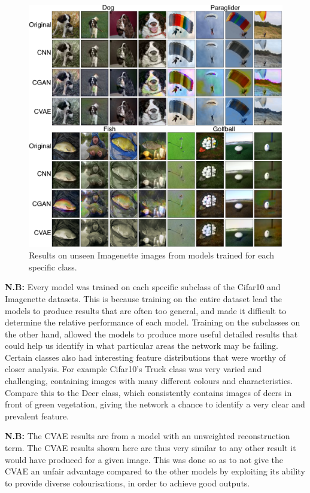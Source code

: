 \documentclass{l4proj}
\begin{document}
\begin{figure}[H]
    \centering
    \includegraphics[width=1.0\linewidth]{images/ImagenetteEval.png}    
    \caption{Results on unseen Imagenette images from models trained for each specific class.}
    \label{fig:imagenetteeval}
\end{figure}

\textbf{N.B:} Every model was trained on each specific subclass of the Cifar10 and Imagenette datasets. This is because training on the entire dataset lead the models to produce results that are often too general, and made it difficult to determine the relative performance of each model. Training on the subclasses on the other hand, allowed the models to produce more useful detailed results that could help us identify in what particular areas the network may be failing. Certain classes also had interesting feature distributions that were worthy of closer analysis. For example Cifar10's Truck class was very varied and challenging, containing images with many different colours and characteristics. Compare this to the Deer class, which consistently contains images of deers in front of green vegetation, giving the network a chance to identify a very clear and prevalent feature.

\textbf{N.B:} The CVAE results are from a model with an unweighted reconstruction term. The CVAE results shown here are thus very similar to any other result it would have produced for a given image. This was done so as to not give the CVAE an unfair advantage compared to the other models by exploiting its ability to provide diverse colourisations, in order to achieve good outputs. 
\end{document}
